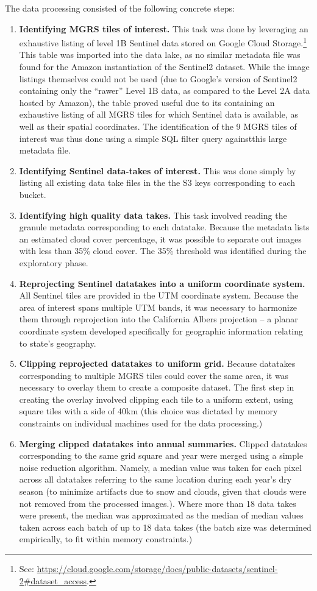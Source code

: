 The data processing consisted of the following concrete steps:

\begin{enumerate}
   \item \textbf{Identifying MGRS tiles of interest.} This task was done by leveraging an exhaustive listing of level 1B Sentinel data stored on Google Cloud Storage.\footnote{See: \url{https://cloud.google.com/storage/docs/public-datasets/sentinel-2#dataset_access}.} This table was imported into the data lake, as no similar metadata file was found for the Amazon instantiation of the Sentinel2 dataset. While the image listings themselves could not be used (due to Google's version of Sentinel2 containing only the ``rawer'' Level 1B data, as compared to the Level 2A data hosted by Amazon), the table proved useful due to its containing an exhaustive listing of all MGRS tiles for which Sentinel data is available, as well as their spatial coordinates. The identification of the 9 MGRS tiles of interest was thus done using a simple SQL filter query againstthis large metadata file. 
   \item \textbf{Identifying Sentinel data-takes of interest.} This was done simply by listing all existing data take files in the the S3 keys corresponding to each bucket.
   \item \textbf{Identifying high quality data takes.} This task involved reading the granule metadata corresponding to each datatake. Because the metadata lists an estimated cloud cover percentage, it was possible to separate out images with less than 35\% cloud cover. The 35\% threshold was identified during the exploratory phase.
   \item \textbf{Reprojecting Sentinel datatakes into a uniform coordinate system.} All Sentinel tiles are provided in the UTM coordinate system. Because the area of interest spans multiple UTM bands, it was necessary to harmonize them through reprojection into the California Albers projection -- a planar coordinate system developed specifically for geographic information relating to state's geography.
   \item \textbf{Clipping reprojected datatakes to uniform grid.} Because datatakes corresponding to multiple MGRS tiles could cover the same area, it was necessary to overlay them to create a composite dataset. The first step in creating the overlay involved clipping each tile to a uniform extent, using square tiles with a side of 40km (this choice was dictated by memory constraints on individual machines used for the data processing.)
   \item \textbf{Merging clipped datatakes into annual summaries.} Clipped datatakes corresponding to the same grid square and year were merged using a simple noise reduction algorithm. Namely, a median value was taken for each pixel across all datatakes referring to the same location during each year's dry season (to minimize artifacts due to snow and clouds, given that clouds were not removed from the processed images.). Where more than 18 data takes were present, the median was approximated as the median of median values taken across each batch of up to 18 data takes (the batch size was determined empirically, to fit within memory constraints.)
\end{enumerate}

